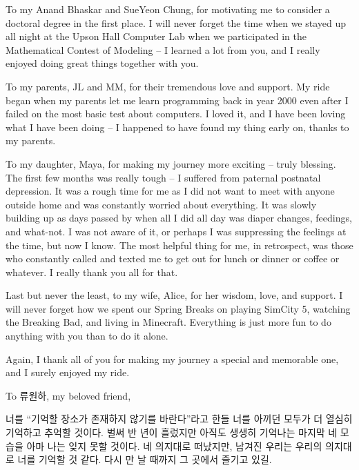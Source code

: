 To my Anand Bhaskar and SueYeon Chung, for motivating me to consider a doctoral degree in the first place. I will never forget the time when we stayed up all night at the Upson Hall Computer Lab when we participated in the Mathematical Contest of Modeling -- I learned a lot from you, and I really enjoyed doing great things together with you. 

To my parents, JL and MM, for their tremendous love and support. My ride began when my parents let me learn programming back in year 2000 even after I failed on the most basic test about computers. I loved it, and I have been loving what I have been doing -- I happened to have found my thing early on, thanks to my parents. 

To my daughter, Maya, for making my journey more exciting -- truly blessing. The first few months was really tough -- I suffered from paternal postnatal depression. It was a rough time for me as I did not want to meet with anyone outside home and was constantly worried about everything. It was slowly building up as days passed by when all I did all day was diaper changes, feedings, and what-not. I was not aware of it, or perhaps I was suppressing the feelings at the time, but now I know. The most helpful thing for me, in retrospect, was those who constantly called and texted me to get out for lunch or dinner or coffee or whatever. I really thank you all for that.

Last but never the least, to my wife, Alice, for her wisdom, love, and support. I will never forget how we spent our Spring Breaks on playing SimCity 5, watching the Breaking Bad, and living in Minecraft. Everything is just more fun to do anything with you than to do it alone. 

Again, I thank all of you for making my journey a special and memorable one, and I surely enjoyed my ride.


\vspace{2 em}

To 류원하, my beloved friend,

너를 ``기억할 장소가 존재하지 않기를 바란다''라고 한들
너를 아끼던 모두가 더 열심히 기억하고 추억할 것이다.
벌써 반 년이 흘렀지만 아직도 생생히 기억나는 마지막 네 모습을 아마 나는 잊지 못할 것이다.
네 의지대로 떠났지만, 남겨진 우리는 우리의 의지대로 너를 기억할 것 같다. 
다시 만 날 때까지 그 곳에서 즐기고 있길.

